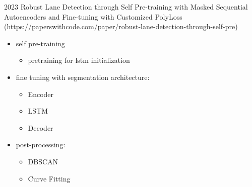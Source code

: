 2023 Robust Lane Detection through Self Pre-training with Masked Sequential Autoencoders and Fine-tuning with Customized PolyLoss (https://paperswithcode.com/paper/robust-lane-detection-through-self-pre)
\begin{itemize}
    \item self pre-training
    \begin{itemize}
        \item pretraining for lstm initialization
    \end{itemize}
    \item fine tuning with segmentation architecture:
    \begin{itemize}
        \item Encoder
        \item LSTM
        \item Decoder
    \end{itemize}
    \item post-processing:
    \begin{itemize}
        \item DBSCAN
        \item Curve Fitting
    \end{itemize}
\end{itemize}
